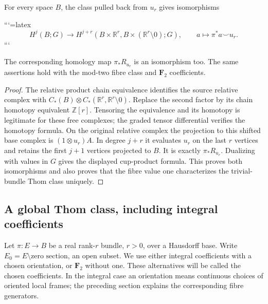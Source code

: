 \begin{proposition}
For every space \(B\), the class pulled back from \(u_r\) gives isomorphisms



```{=latex}
\[
H^j(B;G)\longrightarrow
H^{j+r}(B\times\mathbb R^r,B\times(\mathbb R^r\setminus0);G),
\qquad a\longmapsto\pi^*a\smile u_r.
\]
```



The corresponding homology map \(\pi_*R_{u_r}\) is an isomorphism too. The same assertions hold with the mod-two fibre class and \(\mathbf F_2\) coefficients.
\end{proposition}
\begin{proof}
The relative product chain equivalence identifies the source relative complex with
\(C_*(B)\otimes C_*(\mathbb R^r,\mathbb R^r\setminus0)\).
Replace the second factor by its chain homotopy equivalent \(\mathbb Z[r]\). Tensoring the equivalence and its homotopy is legitimate for these free complexes; the graded tensor differential verifies the homotopy formula. On the original relative complex the projection to this shifted base complex is
\((1\otimes u_r)A\).
In degree \(j+r\) it evaluates \(u_r\) on the last \(r\) vertices and retains the first \(j+1\) vertices projected to \(B\). It is exactly \(\pi_*R_{u_r}\). Dualizing with values in \(G\) gives the displayed cup-product formula. This proves both isomorphisms and also proves that the fibre value one characterizes the trivial-bundle Thom class uniquely.
\end{proof}

\subsection{A global Thom class, including integral coefficients}
\label{courseIII:thom-euler-for-lesson11:section-7}

Let \(\pi:E\to B\) be a real rank-\(r\) bundle, \(r>0\), over a Hausdorff base. Write \(E_0=E\setminus\text{zero section}\), an open subset. We use either integral coefficients with a chosen orientation, or \(\mathbf F_2\) without one. These alternatives will be called the chosen coefficients. In the integral case an orientation means continuous choices of oriented local frames; the preceding section explains the corresponding fibre generators.

\label{courseIII:thom-euler-for-lesson11:CG-S6-CHAIN-THEOREM-7.1}

